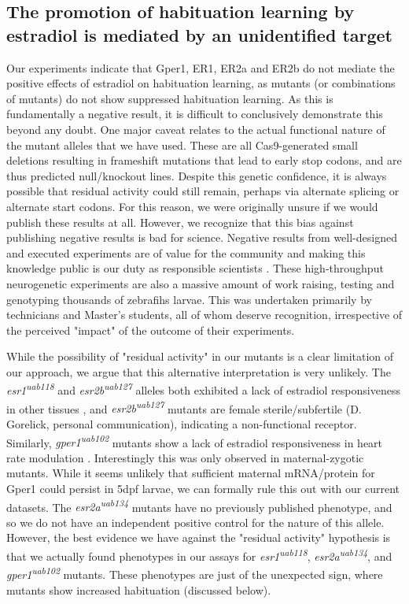\documentclass[9pt,lineno]{RandlettLab_elife}
\begin{document}
{\subsection{The promotion of habituation learning by estradiol is mediated by an unidentified target} 
Our experiments indicate that Gper1, ER1, ER2a and ER2b do not mediate the positive effects of estradiol on habituation learning, as mutants (or combinations of mutants) do not show suppressed habituation learning. 
As this is fundamentally a negative result, it is difficult to conclusively demonstrate this beyond any doubt. 
One major caveat relates to the actual functional nature of the mutant alleles that we have used. 
These are all Cas9-generated small deletions resulting in frameshift mutations that lead to early stop codons, and are thus predicted null/knockout lines. 
Despite this genetic confidence, it is always possible that residual activity could still remain, perhaps via alternate splicing or alternate start codons. 
For this reason, we were originally unsure if we would publish these results at all.
However, we recognize that this bias against publishing negative results is bad for science. 
Negative results from well-designed and executed experiments are of value for the community and making this knowledge public is our duty as responsible scientists \citep{Mlinaric2017-kr}. 
These high-throughput neurogenetic experiments are also a massive amount of work raising, testing and genotyping thousands of zebrafihs larvae.
This was undertaken primarily by technicians and Master's students, all of whom deserve recognition, irrespective of the perceived "impact" of the outcome of their experiments.

While the possibility of "residual activity" in our mutants is a clear limitation of our approach, we argue that this alternative interpretation is very unlikely. The \emph{esr1\textsuperscript{uab118}} and \emph{esr2b\textsuperscript{uab127}} alleles both exhibited a lack of estradiol responsiveness in other tissues \citep{Romano2017-ep}, and \emph{esr2b\textsuperscript{uab127}} mutants are female sterile/subfertile (D. Gorelick, personal communication), indicating a non-functional receptor.
Similarly, \emph{gper1\textsuperscript{uab102}} mutants show a lack of estradiol responsiveness in heart rate modulation \citep{Romano2017-ep}. 
Interestingly this was only observed in maternal-zygotic mutants. 
While it seems unlikely that sufficient maternal mRNA/protein for Gper1 could persist in 5dpf larvae, we can formally rule this out with our current datasets. 
The \emph{esr2a\textsuperscript{uab134}} mutants have no previously published phenotype, and so we do not have an independent positive control for the nature of this allele. However, the best evidence we have against the "residual activity" hypothesis is that we actually found phenotypes in our assays for \emph{esr1\textsuperscript{uab118}}, \emph{esr2a\textsuperscript{uab134}},  and \emph{gper1\textsuperscript{uab102}} mutants. 
These phenotypes are just of the unexpected sign, where mutants show increased habituation (discussed below). 

}
\end{document}

